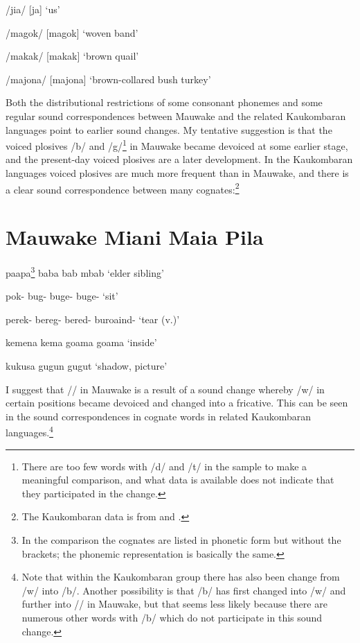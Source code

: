 /jia/  [j{\textsci{{\textprimstress}}}a]  `us'

/magok/  [ma{{\textprimstress}gok}]  `woven band'

/makak/  [ma{{\textprimstress}kak}]  `brown quail'

/majona/  [ma{{\textprimstress}jona}]  `brown-collared bush turkey'

Both the distributional restrictions of some consonant phonemes and some regular sound correspondences between Mauwake and the related Kaukombaran languages point to earlier sound changes. My tentative suggestion is that the voiced plosives /b/ and /g/\footnote{There are too few words with /d/ and /t/ in the sample to make a meaningful comparison, and what data is available does not indicate that they participated in the change.}  in Mauwake became devoiced at some earlier stage, and the present-day voiced plosives are a later development. In the Kaukombaran languages voiced plosives are much more frequent than in Mauwake, and there is a clear sound correspondence between many cognates:\footnote{The Kaukombaran data is from \citet{LoewekeEtAlms} and \citep{ZGraggen1980}.} 

\section{{\bfseries
Mauwake  Miani  Maia  Pila}}

paapa\footnote{In the comparison the cognates are listed in phonetic form but without the brackets; the phonemic representation is basically the same.}   baba  bab  mbab  `elder sibling'

pok-  bug-  buge-  buge-  `sit'

perek-  bereg-  bered-  buroaind-  `tear (v.)'

kemena  kema  goama  {\ng}goama  `inside'

kukusa  gugun    gugut  `shadow, picture'

I suggest that /{\textphi}/ in Mauwake is a result of a sound change whereby /w/ in certain positions became devoiced and changed into a fricative. This can be seen in the sound correspondences in cognate words in related Kaukombaran languages.\footnote{Note that within the Kaukombaran group there has also been change from /w/ into /b/.  Another possibility is that /b/ has first changed into /w/ and further into /{\textphi}/ in Mauwake, but that seems less likely because there are numerous other words with /b/ which do not participate in this sound change.} 

